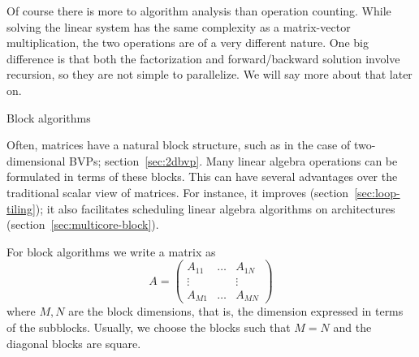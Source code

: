 Of course there is more to algorithm analysis than operation counting.
While solving the linear system has the same complexity
as a matrix-vector multiplication, the two operations
are of a very different nature.
One big difference is that both the factorization
and forward/backward solution involve recursion, so they are not simple
to parallelize. We will say more about that later on.


\begin{comment}
\Level 1 {Accuracy}

In section \ref{sec:linear-arith} you saw some simple examples of the
problems that stem from the use of computer arithmetic, and how these
motivated the use of pivoting. Even with pivoting, however, we still
need to worry about the accumulated effect of roundoff
errors. A~productive way of looking at the question of attainable
accuracy is to consider that by solving a system $Ax=b$ we get
a numerical solution $x+\Delta x$ which is the exact solution of a
slightly different linear system: 
\[ (A+\Delta A)(x+\Delta x)=b+\Delta b. \]
Analyzing these statements quickly leads to bounds such as 
\[ \frac{\|\Delta x\|}{\|x\|}\leq 
  \frac{2\epsilon \kappa(A)}{1-\epsilon\kappa(A)} 
\]
where $\epsilon$ is the \indexterm{machine precision} (see
section~\ref{sec:machine-eps}) and $\kappa(A)=\|A\|\|A\inv\|$ is
called the \indexterm{condition number} of the matrix~$A$ (see
appendix~\ref{app:norms}). Without going into this in any detail, we
remark that the condition number is related to eigenvalues (strictly
speaking: singular values) of the
matrix.

The analysis of the accuracy of algorithms is a field of study in
itself; see for instance the book by Higham~\cite{Higham:2002:ASN}.
\end{comment}

 {Block algorithms}
\label{sec:block-algebra}

Often, matrices have a natural block structure, such as in the case of
two-dimensional \ac{BVP}s; section~\ref{sec:2dbvp}. Many linear
algebra operations can be formulated in terms of these blocks.  This
can have several advantages over the traditional scalar view of
matrices. For instance, it improves 
(section~\ref{sec:loop-tiling}); it also facilitates scheduling linear
algebra algorithms on  architectures
(section~\ref{sec:multicore-block}).

For block algorithms
we write a matrix as 
\[ A=
\begin{pmatrix}
  A_{11}&\ldots&A_{1N}\\ \vdots&&\vdots\\ A_{M1}&\ldots&A_{MN}
\end{pmatrix}
\] 
where $M,N$ are the block dimensions, that is, the dimension expressed
in terms of the subblocks. Usually, we choose the blocks such that
$M=N$ and the diagonal blocks are square.

